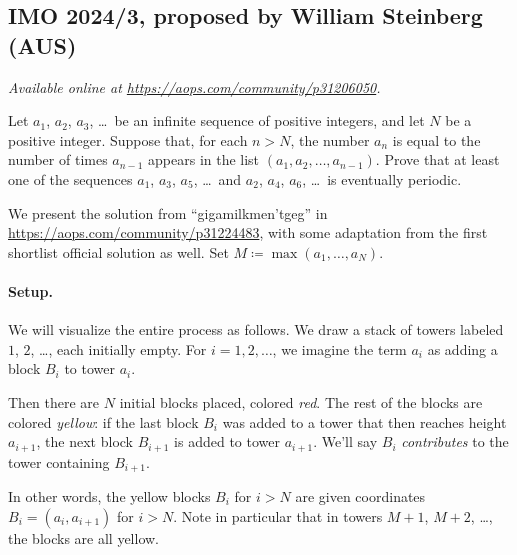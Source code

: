 \documentclass[11pt]{scrartcl}
\begin{document}
\subsection{IMO 2024/3, proposed by William Steinberg (AUS)}
\textsl{Available online at \url{https://aops.com/community/p31206050}.}
\begin{mdframed}[style=mdpurplebox,frametitle={Problem statement}]
Let $a_1$, $a_2$, $a_3$, \dots\ be an infinite sequence of positive integers,
and let $N$ be a positive integer.
Suppose that, for each $n > N$,
the number $a_n$ is equal to the number of times $a_{n-1}$ appears
in the list $(a_1, a_2, \dots, a_{n-1})$.
Prove that at least one of the sequences $a_1$, $a_3$, $a_5$, \dots\
and $a_2$, $a_4$, $a_6$, \dots\ is eventually periodic.
\end{mdframed}
We present the solution from ``gigamilkmen'tgeg''
in \url{https://aops.com/community/p31224483},
with some adaptation from the first shortlist official solution as well.
Set $M \coloneq \max(a_1, \dots, a_N)$.

\paragraph{Setup.}
We will visualize the entire process as follows.
We draw a stack of towers labeled $1$, $2$, \dots, each initially empty.
For $i=1,2,\dots$, we imagine the term $a_i$ as adding a block $B_i$ to tower $a_i$.

Then there are $N$ initial blocks placed, colored \emph{red}.
The rest of the blocks are colored \emph{yellow}:
if the last block $B_i$ was added to a tower that then reaches height $a_{i+1}$,
the next block $B_{i+1}$ is added to tower $a_{i+1}$.
We'll say $B_i$ \emph{contributes} to the tower containing $B_{i+1}$.

In other words, the yellow blocks $B_i$ for $i > N$
are given coordinates $B_i = (a_i, a_{i+1})$ for $i>N$.
Note in particular that in towers $M+1$, $M+2$, \dots, the blocks are all yellow.
\end{document}
